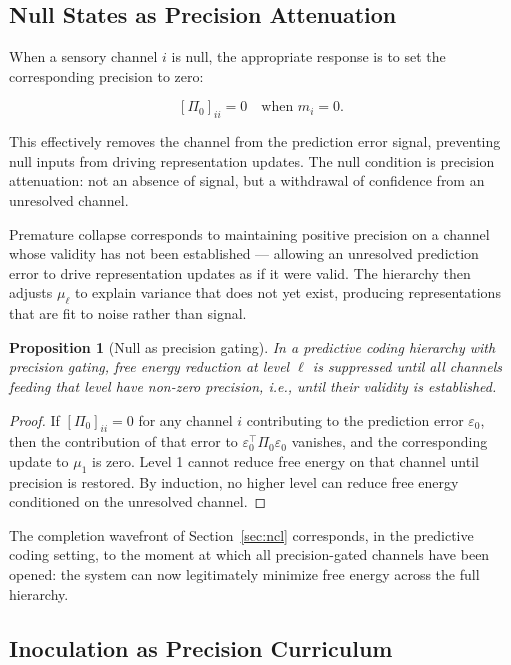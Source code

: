 \documentclass[11pt]{article}
\newtheorem{proposition}{Proposition}
\theoremstyle{remark}
\begin{document}
\subsection{Null States as Precision Attenuation}

When a sensory channel $i$ is null, the appropriate response is to set the corresponding precision to zero:

\[
[\Pi_0]_{ii} = 0 \quad \text{when } m_i = 0.
\]

This effectively removes the channel from the prediction error signal, preventing null inputs from driving representation updates. The null condition is precision attenuation: not an absence of signal, but a withdrawal of confidence from an unresolved channel.

Premature collapse corresponds to maintaining positive precision on a channel whose validity has not been established --- allowing an unresolved prediction error to drive representation updates as if it were valid. The hierarchy then adjusts $\mu_\ell$ to explain variance that does not yet exist, producing representations that are fit to noise rather than signal.

\begin{proposition}[Null as precision gating]
In a predictive coding hierarchy with precision gating, free energy reduction at level $\ell$ is suppressed until all channels feeding that level have non-zero precision, i.e., until their validity is established.
\end{proposition}

\begin{proof}
If $[\Pi_0]_{ii} = 0$ for any channel $i$ contributing to the prediction error $\varepsilon_0$, then the contribution of that error to $\varepsilon_0^\top \Pi_0 \varepsilon_0$ vanishes, and the corresponding update to $\mu_1$ is zero. Level 1 cannot reduce free energy on that channel until precision is restored. By induction, no higher level can reduce free energy conditioned on the unresolved channel.
\end{proof}

The completion wavefront of Section~\ref{sec:ncl} corresponds, in the predictive coding setting, to the moment at which all precision-gated channels have been opened: the system can now legitimately minimize free energy across the full hierarchy.

\subsection{Inoculation as Precision Curriculum}
\end{document}
